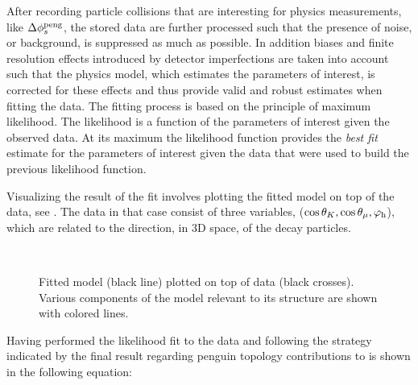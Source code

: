 After recording particle collisions that are interesting for physics measurements, like $\Delta\phi_{s}^{\tiny\text{peng}}$,
the stored data are further processed such that the presence of noise, or background, is suppressed as much
as possible. In addition biases and finite resolution effects introduced by detector imperfections are
taken into account such that the physics model, which estimates the parameters of interest, is
corrected for these effects and thus provide valid and robust estimates when fitting the data.
The fitting process is based on the principle of maximum likelihood. The likelihood is a
function of the parameters of interest given the observed data. At its maximum the likelihood function
provides the {\it best fit} estimate for the parameters of interest given the data that were
used to build the previous likelihood function.

Visualizing the result of the fit involves plotting the fitted model on top of the data,
see . The data in that case consist of three variables,
($\cos\theta_{K}, \cos\theta_{\mu}, \varphi_{\rm h}$), which are related to the direction, in 3D space,
of the \BsJpsiPhi decay particles.

\begin{figure}[!t]
  \begin{subfigure}{0.5\textwidth}
    \centering
    \scalebox{1.2}{}
  \end{subfigure}%
  \hfill
  \begin{subfigure}{0.5\textwidth}
    \centering
    \scalebox{1.2}{}
  \end{subfigure}\\
  \begin{subfigure}{\textwidth}
    \centering
    \scalebox{1.2}{}
  \end{subfigure}
  \caption{Fitted model (black line) plotted on top of \BsJpsiKst data (black crosses).
           Various components of the model relevant to its \CP structure are shown with colored lines.}
  \label{app_angular_plot_thetas}
\end{figure}

Having performed the likelihood fit to the data and
following the strategy indicated by \cite{Fleischer:1999zi,Faller:2008gt,DeBruyn:2014oga,DeBruyn-thesis}
the final result regarding penguin topology contributions to \phis is shown in the following equation:

